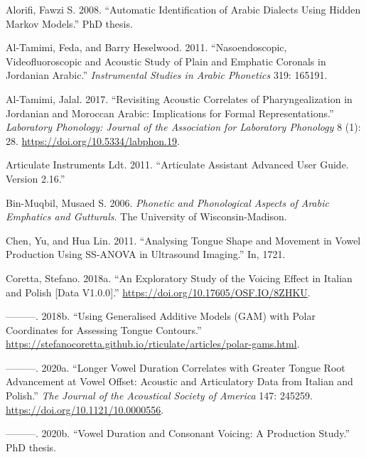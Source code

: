 \documentclass[
]{interact}
\newlength{\cslhangindent}
\newenvironment{CSLReferences}[2] %
 {\begin{list}{}{%
  \setlength{\itemindent}{0pt}
  \setlength{\leftmargin}{0pt}
  \setlength{\parsep}{0pt}
  \ifodd #1
   \setlength{\leftmargin}{\cslhangindent}
   \setlength{\itemindent}{-1\cslhangindent}
  \fi
  \setlength{\itemsep}{#2\baselineskip}}}
 {\end{list}}
\begin{document}
\label{refs}
\begin{CSLReferences}{1}{0}
Alorifi, Fawzi S. 2008. {``Automatic Identification of Arabic Dialects
Using Hidden Markov Models.''} PhD thesis.

Al-Tamimi, Feda, and Barry Heselwood. 2011. {``Nasoendoscopic,
Videofluoroscopic and Acoustic Study of Plain and Emphatic Coronals in
Jordanian Arabic.''} \emph{Instrumental Studies in Arabic Phonetics}
319: 165191.

Al-Tamimi, Jalal. 2017. {``Revisiting Acoustic Correlates of
Pharyngealization in Jordanian and Moroccan Arabic: Implications for
Formal Representations.''} \emph{Laboratory Phonology: Journal of the
Association for Laboratory Phonology} 8 (1): 28.
\url{https://doi.org/10.5334/labphon.19}.

Articulate Instruments Ldt. 2011. {``Articulate Assistant Advanced User
Guide. {Version} 2.16.''}

Bin-Muqbil, Musaed S. 2006. \emph{Phonetic and Phonological Aspects of
Arabic Emphatics and Gutturals}. The University of Wisconsin-Madison.

Chen, Yu, and Hua Lin. 2011. {``Analysing Tongue Shape and Movement in
Vowel Production Using SS-ANOVA in Ultrasound Imaging.''} In, 1721.

Coretta, Stefano. 2018a. {``An Exploratory Study of the Voicing Effect
in Italian and Polish {[}Data V1.0.0{]}.''}
\url{https://doi.org/10.17605/OSF.IO/8ZHKU}.

---------. 2018b. {``Using Generalised Additive Models (GAM) with Polar
Coordinates for Assessing Tongue Contours.''}
\url{https://stefanocoretta.github.io/rticulate/articles/polar-gams.html}.

---------. 2020a. {``Longer Vowel Duration Correlates with Greater
Tongue Root Advancement at Vowel Offset: Acoustic and Articulatory Data
from Italian and Polish.''} \emph{The Journal of the Acoustical Society
of America} 147: 245259. \url{https://doi.org/10.1121/10.0000556}.

---------. 2020b. {``Vowel Duration and Consonant Voicing: A Production
Study.''} PhD thesis.


\end{CSLReferences}
\end{document}
